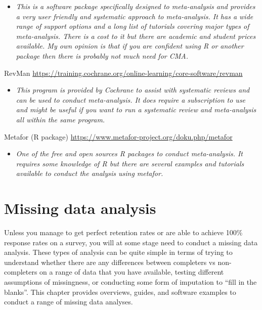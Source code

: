 \documentclass[
]{book}
\providecommand{\tightlist}{%
  \setlength{\itemsep}{0pt}\setlength{\parskip}{0pt}}
\begin{document}
\begin{itemize}
\tightlist
\item
  \emph{This is a software package specifically designed to meta-analysis and provides a very user friendly and systematic approach to meta-analysis. It has a wide range of support options and a long list of tutorials covering major types of meta-analysis. There is a cost to it but there are academic and student prices available. My own opinion is that if you are confident using R or another package then there is probably not much need for CMA. }
\end{itemize}

RevMan \url{https://training.cochrane.org/online-learning/core-software/revman}

\begin{itemize}
\tightlist
\item
  \emph{This program is provided by Cochrane to assist with systematic reviews and can be used to conduct meta-analysis. It does require a subscription to use and might be useful if you want to run a systematic review and meta-analysis all within the same program.}
\end{itemize}

Metafor (R package) \url{https://www.metafor-project.org/doku.php/metafor}

\begin{itemize}
\tightlist
\item
  \emph{One of the free and open sources R packages to conduct meta-analysis. It requires some knowledge of R but there are several examples and tutorials available to conduct the analysis using metafor.}
\end{itemize}

\chapter{Missing data analysis}\label{missing-data-analysis}

Unless you manage to get perfect retention rates or are able to achieve 100\% response rates on a survey, you will at some stage need to conduct a missing data analysis. These types of analysis can be quite simple in terms of trying to understand whether there are any differences between completers vs non-completers on a range of data that you have available, testing different assumptions of missingness, or conducting some form of imputation to ``fill in the blanks''. This chapter provides overviews, guides, and software examples to conduct a range of missing data analyses.
\end{document}
